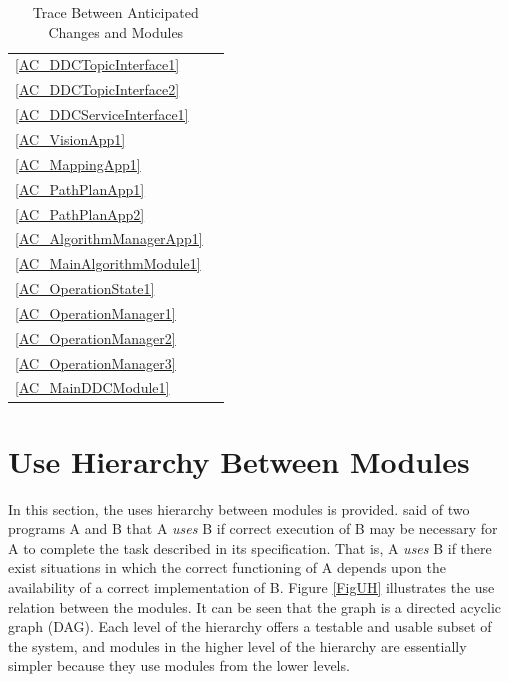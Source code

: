 \documentclass[12pt, titlepage]{article}
\begin{document}
\begin{table}[H]
\begin{tabular}{p{} p{}}
\ref{AC_DDCTopicInterface1} & \nameref{DDC Topic Interface} \\
\ref{AC_DDCTopicInterface2} & \nameref{DDC Topic Interface} \\
\ref{AC_DDCServiceInterface1} & \nameref{DDC Service Interface} \\
\ref{AC_VisionApp1} & \nameref{Vision App} \\
\ref{AC_MappingApp1} & \nameref{Mapper App} \\
\ref{AC_PathPlanApp1} & \nameref{Path Plan App} \\
\ref{AC_PathPlanApp2} & \nameref{Path Plan App} \\
\ref{AC_AlgorithmManagerApp1} & \nameref{Algorithm Manager App} \\
\ref{AC_MainAlgorithmModule1} & \nameref{Main Algorithm Module} \\
\ref{AC_OperationState1} & \nameref{Operation States} \\
\ref{AC_OperationManager1} & \nameref{Operations Manager} \\
\ref{AC_OperationManager2} & \nameref{Operations Manager} \\
\ref{AC_OperationManager3} & \nameref{Operations Manager} \\
\ref{AC_MainDDCModule1} & \nameref{Main DDC Module} \\


\bottomrule
\end{tabular}
\caption{Trace Between Anticipated Changes and Modules}
\label{TblACT}
\end{table}

\section{Use Hierarchy Between Modules} \label{SecUse}

In this section, the uses hierarchy between modules is
provided. \citet{Parnas1978} said of two programs A and B that A {\em uses} B if
correct execution of B may be necessary for A to complete the task described in
its specification. That is, A {\em uses} B if there exist situations in which
the correct functioning of A depends upon the availability of a correct
implementation of B.  Figure \ref{FigUH} illustrates the use relation between
the modules. It can be seen that the graph is a directed acyclic graph
(DAG). Each level of the hierarchy offers a testable and usable subset of the
system, and modules in the higher level of the hierarchy are essentially simpler
because they use modules from the lower levels.
\end{document}
